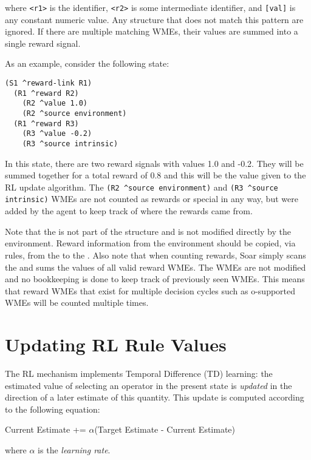 where \verb=<r1>= is the  identifier, \verb=<r2>= is some intermediate identifier, and \verb=[val]= is any constant numeric value.
Any structure that does not match this pattern are ignored.
If there are multiple matching WMEs, their values are summed into a single reward signal.

As an example, consider the following state:

\begin{verbatim}
(S1 ^reward-link R1)
  (R1 ^reward R2)
    (R2 ^value 1.0)
    (R2 ^source environment)
  (R1 ^reward R3)
    (R3 ^value -0.2)
    (R3 ^source intrinsic)
\end{verbatim}  

In this state, there are two reward signals with values 1.0 and -0.2.
They will be summed together for a total reward of 0.8 and this will be the value given to the RL update algorithm.
The \verb=(R2 ^source environment)= and \verb=(R3 ^source intrinsic)= WMEs are not counted as rewards or special in any way, but were added by the agent to keep track of where the rewards came from.

Note that the  is not part of the  structure and is not modified directly by the environment.
Reward information from the environment should be copied, via rules, from the  to the .
Also note that when counting rewards, Soar simply scans the  and sums the values of all valid reward WMEs.
The WMEs are not modified and no bookkeeping is done to keep track of previously seen WMEs.
This means that reward WMEs that exist for multiple decision cycles such as o-supported WMEs will be counted multiple times.

\section{Updating RL Rule Values}
\label{RL-algo}

The RL mechanism implements Temporal Difference (TD) learning: the estimated value of selecting an operator in the present state is \emph{updated} in the direction of a later estimate of this quantity.
This update is computed according to the following equation:

\begin{center}
Current Estimate += $\alpha$(Target Estimate - Current Estimate)
\end{center}

where $\alpha$ is the \emph{learning rate}.

